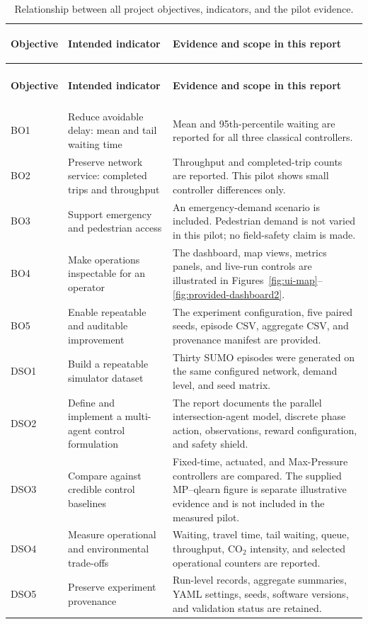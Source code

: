 \documentclass[11pt,a4paper]{article}
\begin{document}
\begin{longtable}{>{\bfseries\raggedright\arraybackslash}p{1.8cm}
                  >{\raggedright\arraybackslash}p{4.7cm}
                  >{\raggedright\arraybackslash}p{9.2cm}}
\caption{Relationship between all project objectives, indicators, and the pilot evidence.}
\label{tab:objective-evidence}\\
\toprule
\textbf{Objective} & \textbf{Intended indicator} & \textbf{Evidence and scope in this report} \\
\midrule
\endfirsthead
\multicolumn{3}{l}{\small\itshape Table~\ref{tab:objective-evidence} continued}\\
\toprule
\textbf{Objective} & \textbf{Intended indicator} & \textbf{Evidence and scope in this report} \\
\midrule
\endhead
\midrule
\multicolumn{3}{r}{\small\itshape Continued on next page}\\
\endfoot
\bottomrule
\endlastfoot
BO1 & Reduce avoidable delay: mean and tail waiting time &
Mean and 95th-percentile waiting are reported for all three classical controllers. \\
BO2 & Preserve network service: completed trips and throughput &
Throughput and completed-trip counts are reported. This pilot shows small controller differences only. \\
BO3 & Support emergency and pedestrian access &
An emergency-demand scenario is included. Pedestrian demand is not varied in this pilot; no field-safety claim is made. \\
BO4 & Make operations inspectable for an operator &
The dashboard, map views, metrics panels, and live-run controls are illustrated in Figures~\ref{fig:ui-map}--\ref{fig:provided-dashboard2}. \\
BO5 & Enable repeatable and auditable improvement &
The experiment configuration, five paired seeds, episode CSV, aggregate CSV, and provenance manifest are provided. \\
DSO1 & Build a repeatable simulator dataset &
Thirty SUMO episodes were generated on the same configured network, demand level, and seed matrix. \\
DSO2 & Define and implement a multi-agent control formulation &
The report documents the parallel intersection-agent model, discrete phase action, observations, reward configuration, and safety shield. \\
DSO3 & Compare against credible control baselines &
Fixed-time, actuated, and Max-Pressure controllers are compared. The supplied MP--qlearn figure is separate illustrative evidence and is not included in the measured pilot. \\
DSO4 & Measure operational and environmental trade-offs &
Waiting, travel time, tail waiting, queue, throughput, CO$_2$ intensity, and selected operational counters are reported. \\
DSO5 & Preserve experiment provenance &
Run-level records, aggregate summaries, YAML settings, seeds, software versions, and validation status are retained. \\
\end{longtable}
\end{document}
